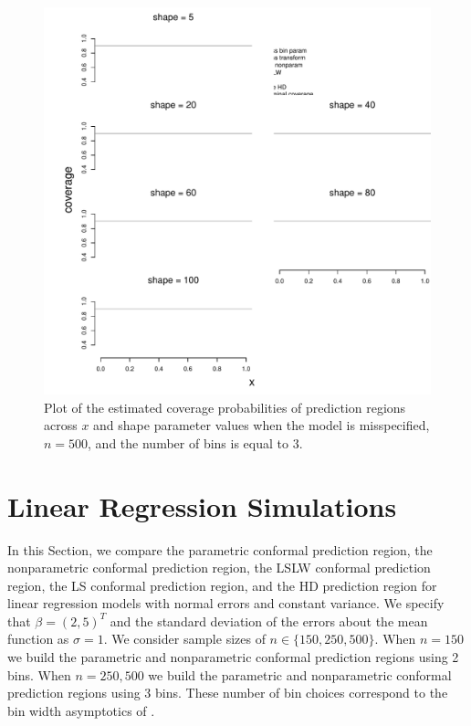 \documentclass[11pt]{article}\usepackage[]{graphicx}\usepackage[]{color}
\makeatletter
\def\maxwidth{ %
  \ifdim\Gin@nat@width>\linewidth
    \linewidth
  \else
    \Gin@nat@width
  \fi
}
\newenvironment{knitrout}{}{} %
\makeatother
\begin{document}
\newpage
\begin{figure}[h!]
\begin{center}
\begin{knitrout}
\color{fgcolor}
\includegraphics[width=\maxwidth]{figure/Fig-misspec-inx-500-1} 

\end{knitrout}
\end{center}
\caption{Plot of the estimated coverage probabilities of prediction regions 
  across $x$ and shape parameter values when the model is misspecified, 
  $n = 500$, and the number of bins is equal to $3$.}
\label{Fig:misspec.inx.500}
\end{figure}





\newpage
\section{Linear Regression Simulations}
\label{sec:regression}

In this Section, we compare the parametric conformal prediction 
region, the nonparametric conformal prediction region, the LSLW conformal 
prediction region, the LS conformal prediction region, and the HD prediction 
region for linear regression models with normal errors and constant variance.  
We specify that $\beta = (2, 5)^T$ and the standard deviation of the errors 
about the mean function as $\sigma = 1$.
We consider sample sizes of $n \in \{150, 250, 500\}$. 
When $n = 150$ we build the parametric and nonparametric conformal prediction 
regions using 2 bins.  When $n = 250, 500$ we build the parametric and 
nonparametric conformal prediction regions using 3 bins.  These number of bin 
choices correspond to the bin width asymptotics of \citet{lei2014distribution}. 
\end{document}
